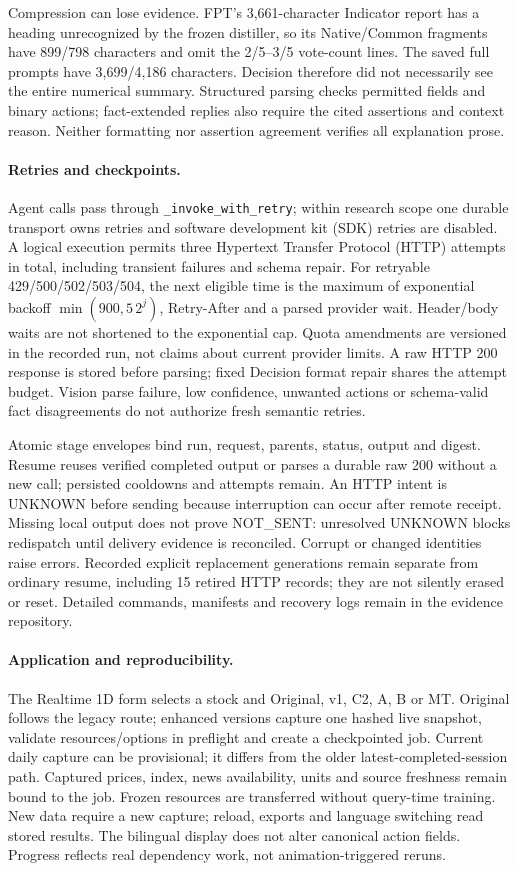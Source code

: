 Compression can lose evidence. FPT's 3,661-character Indicator report has
a heading unrecognized by the frozen distiller, so its Native/Common
fragments have 899/798 characters and omit the 2/5--3/5 vote-count lines.
The saved full prompts have 3,699/4,186 characters. Decision therefore
did not necessarily see the entire numerical summary. Structured parsing
checks permitted fields and binary actions; fact-extended replies also
require the cited assertions and context reason. Neither formatting nor
assertion agreement verifies all explanation prose.

\paragraph{Retries and checkpoints.}
Agent calls pass through \texttt{\_invoke\_with\_retry}; within research
scope one durable transport owns retries and software development kit (SDK) retries are disabled.
A logical execution permits three Hypertext Transfer Protocol (HTTP) attempts in total, including
transient failures and schema repair. For retryable 429/500/502/503/504,
the next eligible time is the maximum of exponential backoff
$\min(900,5\,2^j)$, Retry-After and a parsed provider wait. Header/body
waits are not shortened to the exponential cap. Quota amendments are
versioned in the recorded run, not claims about current provider limits.
A raw HTTP 200 response is stored before parsing; fixed Decision format
repair shares the attempt budget. Vision parse failure, low confidence,
unwanted actions or schema-valid fact disagreements do not authorize
fresh semantic retries.

Atomic stage envelopes bind run, request, parents, status, output and
digest. Resume reuses verified completed output or parses a durable raw
200 without a new call; persisted cooldowns and attempts remain.
An HTTP intent is UNKNOWN before sending because interruption can occur
after remote receipt. Missing local output does not prove NOT\_SENT:
unresolved UNKNOWN blocks redispatch until delivery evidence is
reconciled. Corrupt or changed identities raise errors. Recorded explicit
replacement generations remain separate from ordinary resume, including
15 retired HTTP records; they are not silently erased or reset. Detailed
commands, manifests and recovery logs remain in the evidence repository.

\paragraph{Application and reproducibility.}
The Realtime 1D form selects a stock and Original, v1, C2, A, B or MT.
Original follows the legacy route; enhanced versions capture one hashed
live snapshot, validate resources/options in preflight and create a
checkpointed job. Current daily capture can be provisional; it differs
from the older latest-completed-session path. Captured prices, index,
news availability, units and source freshness remain bound to the job.
Frozen resources are transferred without query-time training. New data
require a new capture; reload, exports and language switching read stored
results. The bilingual display does not alter canonical action fields.
Progress reflects real dependency work, not animation-triggered reruns.

